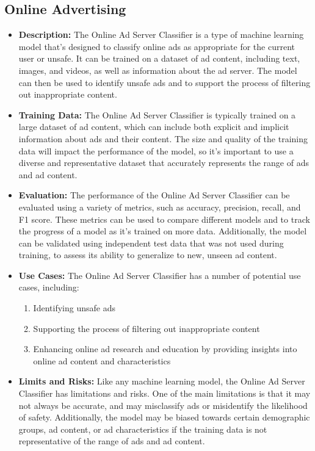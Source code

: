 \subsection{Online Advertising}

\begin{itemize}
    \item \textbf{Description:} The Online Ad Server Classifier is a type of machine learning model that's designed to classify online ads as appropriate for the current user or unsafe. It can be trained on a dataset of ad content, including text, images, and videos, as well as information about the ad server. The model can then be used to identify unsafe ads and to support the process of filtering out inappropriate content.
    \item \textbf{Training Data:} The Online Ad Server Classifier is typically trained on a large dataset of ad content, which can include both explicit and implicit information about ads and their content. The size and quality of the training data will impact the performance of the model, so it's important to use a diverse and representative dataset that accurately represents the range of ads and ad content.
    \item \textbf{Evaluation:} The performance of the Online Ad Server Classifier can be evaluated using a variety of metrics, such as accuracy, precision, recall, and F1 score. These metrics can be used to compare different models and to track the progress of a model as it's trained on more data. Additionally, the model can be validated using independent test data that was not used during training, to assess its ability to generalize to new, unseen ad content.
    \item \textbf{Use Cases:} The Online Ad Server Classifier has a number of potential use cases, including:
        \begin{enumerate}  
            \item Identifying unsafe ads
            \item Supporting the process of filtering out inappropriate content
            \item Enhancing online ad research and education by providing insights into online ad content and characteristics
        \end{enumerate}
    \item \textbf{Limits and Risks:} Like any machine learning model, the Online Ad Server Classifier has limitations and risks. One of the main limitations is that it may not always be accurate, and may misclassify ads or misidentify the likelihood of safety. Additionally, the model may be biased towards certain demographic groups, ad content, or ad characteristics if the training data is not representative of the range of ads and ad content.

\end{itemize}
